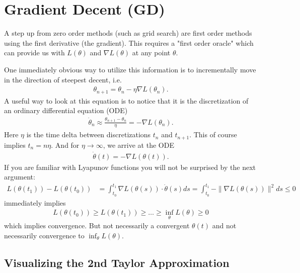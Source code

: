 
\newcommand{\identity}{\mathbb{I}}
\newcommand{\lbound}{\mu_l}
\newcommand{\ubound}{\mu_u}
\newcommand{\diag}{\text{diag}}
\newcommand{\rate}{\text{rate}}
\newcommand{\reals}{\mathbb{R}}
\newcommand{\firstOrderMethod}{\mathcal{M}}

\chapter{Gradient Decent (GD)}

A step up from zero order methods (such as grid search) are first order methods
using the first derivative (the gradient). This requires a "first order oracle"
which can provide us with \(L(\theta)\) and \(\nabla L(\theta)\) at any point
\(\theta\).

One immediately obvious way to utilize this information is to
incrementally move in the direction of steepest decent, i.e.
%
\begin{align*}
	\theta_{n+1} = \theta_n - \eta\nabla L(\theta_n).
\end{align*}
%
A useful way to look at this equation is to notice that it is the
discretization of an ordinary differential equation (ODE)
%
\begin{align*}
	\dot{\theta}_n \approx \frac{\theta_{n+1} - \theta_n}{\eta}
	= - \nabla L(\theta_n).
\end{align*}
%
Here \(\eta\) is the time delta between discretizations \(t_n\) and \(t_{n+1}\).
This of course implies \(t_n = n\eta\). And for \(\eta\to\infty\), we arrive
at the ODE
%
\begin{align}\label{eq: velocity is gradient}
	\dot{\theta}(t) = -\nabla L(\theta(t)).
\end{align}
%
If you are familiar with Lyapunov functions you will not be surprised by the next
argument:
%
\begin{align}\label{eq: gradient integral}
	L(\theta(t_1)) - L(\theta(t_0))
	&= \int_{t_0}^{t_1} \nabla L(\theta(s)) \cdot \dot{\theta}(s) ds
	= \int_{t_0}^{t_1} -\|\nabla L(\theta(s))\|^2 ds
	\le 0
\end{align}
%
immediately implies
\begin{align*}
	L(\theta(t_0)) \ge L(\theta(t_1)) \ge \dots \ge \inf_\theta L(\theta) \ge 0
\end{align*}
which implies convergence. But not necessarily a convergent \(\theta(t)\) and
not necessarily convergence to \(\inf_\theta L(\theta)\).

\section{Visualizing the 2nd Taylor Approximation}\label{sec: visualize gd}

